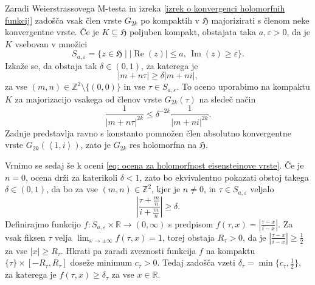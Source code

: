 \documentclass[mat1]{fmfdelo}
\numberwithin{equation}{section}
\newcommand{\R}{\mathbb R}
\newcommand{\Z}{\mathbb Z}
\newcommand{\HH}{\mathfrak{H}}
\newcommand{\abs}[1]{\left\lvert #1 \right\rvert}
\newcommand{\lattice}[2]{\left\langle #1, #2 \right\rangle}
\renewcommand\Re{\operatorname{Re}}%
\renewcommand\Im{\operatorname{Im}}%
\theoremstyle{definition}
\begin{document}
\begin{dokaz}
    Zaradi Weierstrassovega M-testa in izreka \ref{izrek o konvergenci holomorfnih funkcij} zadošča vsak člen vrste $G_{2k}$ po kompaktih v $\HH$ majorizirati s členom neke konvergentne vrste. Če je $K \subseteq \HH$ poljuben kompakt, obstajata taka $a, \varepsilon > 0$, da je $K$ vsebovan v množici 
    \[
        S_{a,\varepsilon} = \{z \in \HH \mid \abs{\Re(z)} \leq a \text{, } \Im(z) \geq \varepsilon \}.
    \]
    Izkaže se, da obstaja tak $\delta \in (0,1)$, za katerega je
    \begin{equation}
        \label{eq: ocena za holomorfnost eisensteinove vrste}
        \abs{m + n\tau} \geq \delta\abs{m + ni},  
    \end{equation}
    za vse $(m, n) \in \Z^2\setminus\{(0,0)\}$ in vse $\tau \in S_{a,\varepsilon}$. To oceno uporabimo na kompaktu $K$ za majorizacijo vsakega od členov vrste $G_{2k}(\tau)$ na sledeč način
    \[
        \frac{1}{\abs{m + n\tau}^{2k}} \leq \delta^{-2k}\frac{1}{\abs{m + ni}^{2k}}.
    \]
    Zadnje predstavlja ravno s konstanto pomnožen člen absolutno konvergentne vrste $G_{2k}(\lattice{1}{i})$, zato je $G_{2k}$ res holomorfna na $\HH$.


    Vrnimo se sedaj še k oceni \eqref{eq: ocena za holomorfnost eisensteinove vrste}. Če je $n = 0$, ocena drži za katerikoli $\delta < 1$, zato bo ekvivalentno pokazati obstoj takega $\delta \in (0,1)$, da bo za vse $(m,n) \in \Z^2$, kjer je $n \neq 0$, in $\tau \in S_{a,\varepsilon}$ veljalo
    \[
        \abs{\frac{\tau + \tfrac{m}{n}}{i + \tfrac{m}{n}}} \geq \delta.
    \]
    Definirajmo funkcijo $f: S_{a, \varepsilon} \times \R \to (0,\infty)$ s predpisom $f(\tau, x) = \abs{\tfrac{\tau - x}{i - x}}$. Za vsak fiksen $\tau$ velja $\lim_{x \to \pm\infty} f(\tau, x) = 1$, torej obstaja $R_\tau > 0$, da je $\abs{\tfrac{\tau - x}{i - x}} \geq \tfrac{1}{2}$ za vse $\abs{x} \geq R_\tau$. Hkrati pa zaradi zveznosti funkcija $f$ na kompaktu $\{\tau\} \times [-R_\tau, R_\tau]$ doseže minimum $c_\tau > 0$. Tedaj zadošča vzeti $\delta_\tau = \min\{c_\tau, \tfrac{1}{2}\}$, za katerega je $f(\tau, x) \geq \delta_\tau$ za vse $x \in \R$.


\end{dokaz}
\end{document}
